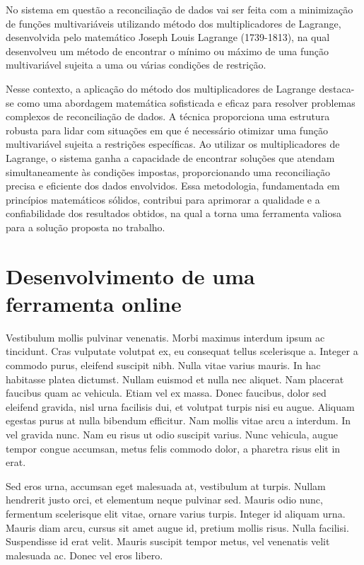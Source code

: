 No sistema em questão a reconciliação de dados vai ser feita com a minimização de funções multivariáveis utilizando método dos multiplicadores de Lagrange, desenvolvida pelo matemático Joseph Louis Lagrange (1739-1813), na qual desenvolveu um método de encontrar o mínimo ou máximo de uma função multivariável sujeita a uma ou várias condições de restrição.

Nesse contexto, a aplicação do método dos multiplicadores de Lagrange destaca-se como uma abordagem matemática sofisticada e eficaz para resolver problemas complexos de reconciliação de dados. A técnica proporciona uma estrutura robusta para lidar com situações em que é necessário otimizar uma função multivariável sujeita a restrições específicas. Ao utilizar os multiplicadores de Lagrange, o sistema ganha a capacidade de encontrar soluções que atendam simultaneamente às condições impostas, proporcionando uma reconciliação precisa e eficiente dos dados envolvidos. Essa metodologia, fundamentada em princípios matemáticos sólidos, contribui para aprimorar a qualidade e a confiabilidade dos resultados obtidos, na qual a torna uma ferramenta valiosa para a solução proposta no trabalho.

\section{Desenvolvimento de uma ferramenta online}

Vestibulum mollis pulvinar venenatis. Morbi maximus interdum ipsum ac tincidunt. Cras vulputate volutpat ex, eu consequat tellus scelerisque a. Integer a commodo purus, eleifend suscipit nibh. Nulla vitae varius mauris. In hac habitasse platea dictumst. Nullam euismod et nulla nec aliquet. Nam placerat faucibus quam ac vehicula. Etiam vel ex massa. Donec faucibus, dolor sed eleifend gravida, nisl urna facilisis dui, et volutpat turpis nisi eu augue. Aliquam egestas purus at nulla bibendum efficitur. Nam mollis vitae arcu a interdum. In vel gravida nunc. Nam eu risus ut odio suscipit varius. Nunc vehicula, augue tempor congue accumsan, metus felis commodo dolor, a pharetra risus elit in erat.

Sed eros urna, accumsan eget malesuada at, vestibulum at turpis. Nullam hendrerit justo orci, et elementum neque pulvinar sed. Mauris odio nunc, fermentum scelerisque elit vitae, ornare varius turpis. Integer id aliquam urna. Mauris diam arcu, cursus sit amet augue id, pretium mollis risus. Nulla facilisi. Suspendisse id erat velit. Mauris suscipit tempor metus, vel venenatis velit malesuada ac. Donec vel eros libero.

